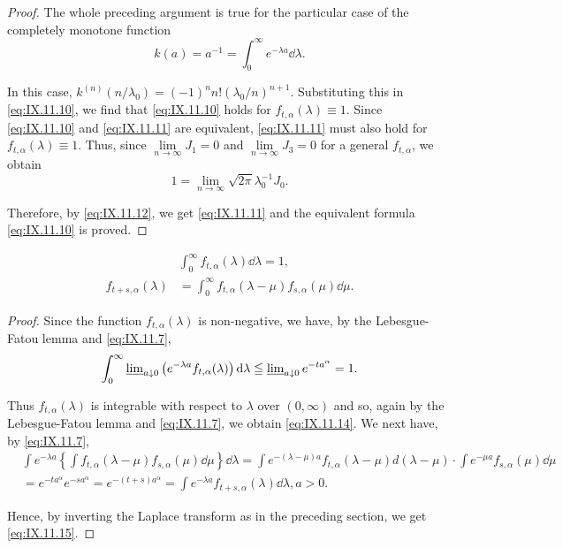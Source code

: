 \begin{proof}
The whole preceding argument is true for the particular case of the completely monotone function 
\[
k (a) = a ^{-1} = \int_{0} ^{\infty} e ^{- \lambda a} \dd \lambda .
\]

In this case, $k^{(n)}(n / \lambda_0) = (-1)^n n!(\lambda_0 / n)^{n+1}$. Substituting this in \eqref{eq:IX.11.10}, we find that \eqref{eq:IX.11.10} holds for $f_{t,\alpha}(\lambda) \equiv 1$. Since \eqref{eq:IX.11.10} and \eqref{eq:IX.11.11} are equivalent, \eqref{eq:IX.11.11} must also hold for $f_{t,\alpha}(\lambda) \equiv 1$. Thus, since $\lim\limits_{n\to \infty}J_1 = 0$ and $\lim\limits_{n\to \infty}J_3 = 0$ for a general $f_{t,\alpha}$, we obtain 
\[
1 = \lim\limits _{n \rightarrow \infty} \sqrt {2 \pi} \lambda_{0} ^{-1} J _{0}.
\]

Therefore, by \eqref{eq:IX.11.12}, we get \eqref{eq:IX.11.11} and the equivalent formula \eqref{eq:IX.11.10} is proved. 
\end{proof}

\begin{proposition}\label{prop:IX.11.Proposition.3} 
\begin{align}
&\int_{0} ^{\infty} f _{t, \alpha} (\lambda) \dd \lambda = 1, \label{eq:IX.11.14} \\
f _{t + s, \alpha} (\lambda)& = \int_{0} ^{\infty} f _{t, \alpha} (\lambda - \mu) f _{s, \alpha} (\mu) \dd \mu . \label{eq:IX.11.15}
\end{align}
\end{proposition}

\begin{proof}
 Since the function $f_{t,\alpha}(\lambda)$ is non-negative, we have, by the Lebesgue-Fatou lemma and \eqref{eq:IX.11.7}, 
\[
\int_{0} ^{\infty} \varliminf\nolimits_{a \downarrow 0} \left(e ^{- \lambda a} f _{t, \alpha} (\lambda)\right) \mathop{}\!\mathrm{d} \lambda \leqq \varliminf\nolimits_{a \downarrow 0} e ^ {- t a ^{\alpha}} = 1. \]

Thus $f_{t,\alpha}(\lambda)$ is integrable with respect to $\lambda$ over $(0,\infty)$ and so, again by 
the Lebesgue-Fatou lemma and \eqref{eq:IX.11.7}, we obtain \eqref{eq:IX.11.14}. We next have, by \eqref{eq:IX.11.7}, 
\[
\begin{aligned}
&\int e ^{- \lambda a} \left\{\int f _{t, \alpha} (\lambda - \mu) f _{s, \alpha} (\mu) \dd \mu \right\} \dd \lambda = \int e ^{-(\lambda - \mu) a} f _{t, \alpha} (\lambda - \mu) d (\lambda - \mu) \cdot \int e ^{- \mu a} f _{s, \alpha} (\mu) \dd \mu
\\
&= e ^ {- t a ^{\alpha}} e ^ {- s a ^{\alpha}} = e ^ {- (t + s) a ^{\alpha}} = \int e ^{- \lambda a} f _{t + s, \alpha} (\lambda) \dd \lambda , a > 0.
\end{aligned}
\]

Hence, by inverting the Laplace transform as in the preceding section, we get \eqref{eq:IX.11.15}. 
\end{proof}


